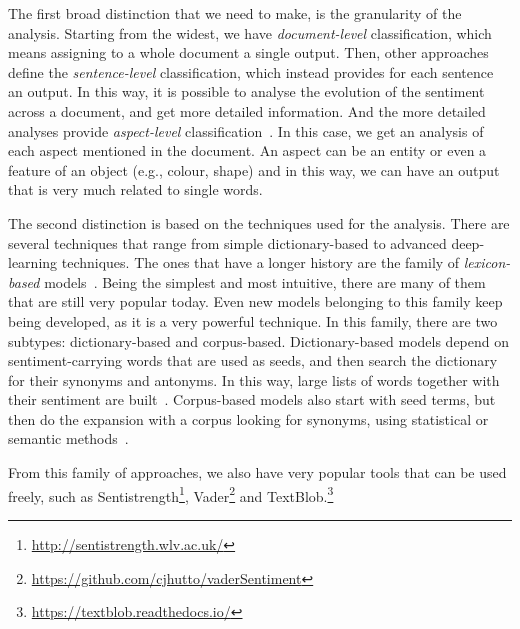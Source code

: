 
The first broad distinction that we need to make, is the granularity of the analysis.
Starting from the widest, we have \emph{document-level} classification, which means assigning to a whole document a single output.
Then, other approaches define the \emph{sentence-level} classification, which instead provides for each sentence an output. In this way, it is possible to analyse the evolution of the sentiment across a document, and get more detailed information.
And the more detailed analyses provide \emph{aspect-level} classification~\citep{zhang2022survey}. In this case, we get an analysis of each aspect mentioned in the document. An aspect can be an entity or even a feature of an object (e.g., colour, shape) and in this way, we can have an output that is very much related to single words.

The second distinction is based on the techniques used for the analysis. There are several techniques that range from simple dictionary-based to advanced deep-learning techniques.
The ones that have a longer history are the family of \emph{lexicon-based} models~\citep{taboada2011lexicon}. Being the simplest and most intuitive, there are many of them that are still very popular today. Even new models belonging to this family keep being developed, as it is a very powerful technique.
In this family, there are two subtypes: dictionary-based and corpus-based.
Dictionary-based models depend on sentiment-carrying words that are used as seeds, and then search the dictionary for their synonyms and antonyms. In this way, large lists of words together with their sentiment are built~\citep{okango2022dictionary,hardeniya2016dictionary}.
Corpus-based models also start with seed terms, but then do the expansion with a corpus looking for synonyms, using statistical or semantic methods~\citep{darwich2019corpus,rice2021corpus}.


From this family of approaches, we also have very popular tools that can be used freely, such as Sentistrength\footnote{\url{http://sentistrength.wlv.ac.uk/}}, Vader\footnote{\url{https://github.com/cjhutto/vaderSentiment}} and TextBlob.\footnote{\url{ https://textblob.readthedocs.io/}}


